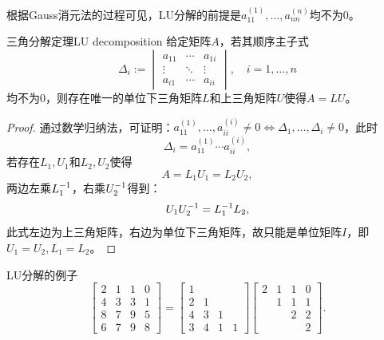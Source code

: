 \begin{remark}
    根据Gauss消元法的过程可见，LU分解的前提是$a_{11}^{(1)},\ldots,a_{nn}^{(n)}$均不为0。
\end{remark}

\begin{theorem}
    {三角分解定理}{LU decomposition}
    给定矩阵$A$，若其顺序主子式
    \begin{equation}
        \Delta_i:=\begin{vmatrix}
            a_{11}&\cdots&a_{1i}\\
            \vdots&\ddots&\vdots\\
            a_{i1}&\cdots&a_{ii}
        \end{vmatrix},\quad i=1,\ldots,n
    \end{equation}
    均不为0，则存在唯一的单位下三角矩阵$L$和上三角矩阵$U$使得$A=LU$。
\end{theorem}
\begin{proof}
    通过数学归纳法，可证明：$a_{11}^{(1)},\ldots,a_{ii}^{(i)}\neq 0\iff\Delta_1,\ldots,\Delta_i\neq 0$，此时
    \begin{equation}
        \Delta_i=a_{11}^{(1)}\cdots a_{ii}^{(i)},
    \end{equation}
    若存在$L_1,U_1$和$L_2,U_2$使得
    \[
        A=L_1U_1=L_2U_2,
    \]
    两边左乘$L_1^{-1}$，右乘$U_2^{-1}$得到：
    \[
        U_1U_2^{-1}=L_1^{-1} L_2,
    \]
    此式左边为上三角矩阵，右边为单位下三角矩阵，故只能是单位矩阵$I$，即$U_1=U_2,L_1=L_2$。
\end{proof}

\begin{example}
    {LU分解的例子}{}
    \[
        \begin{bmatrix}
            2&1&1&0\\4&3&3&1\\8&7&9&5\\6&7&9&8
        \end{bmatrix}=\begin{bmatrix}
            1\\2&1\\4&3&1\\3&4&1&1
        \end{bmatrix}\begin{bmatrix}
            2&1&1&0\\ &1&1&1\\ &&2&2\\ &&&2
        \end{bmatrix}.
    \]
\end{example}

